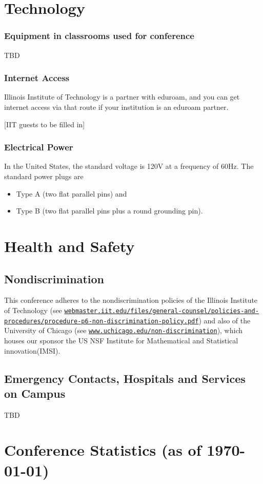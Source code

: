 \section{Technology}

\subsubsection{Equipment in classrooms used for conference}

TBD


\subsubsection{Internet Access}

Illinois Institute of Technology is a partner with eduroam, and you can get internet access via that route if your institution is an eduroam partner.

[IIT guests to be filled in]

\subsubsection{Electrical Power}

In the United States, the standard voltage is 120V at a frequency of 60Hz.  The standard power plugs are
\begin{itemize}
	\item Type A (two flat parallel pins) and
	\item Type B (two flat parallel pins plus a round grounding pin).
\end{itemize}

\section{Health and Safety}

\subsection{Nondiscrimination}
This conference adheres to the nondiscrimination policies of the Illinois Institute of Technology (see \href{https://webmaster.iit.edu/files/general-counsel/policies-and-procedures/procedure-p6-non-discrimination-policy.pdf}{\nolinkurl{webmaster.iit.edu/files/general-counsel/policies-and-procedures/procedure-p6-non-discrimination-policy.pdf}}) and also of the University of Chicago (see \href{https://www.uchicago.edu/non-discrimination}{\nolinkurl{www.uchicago.edu/non-discrimination}}), which houses our sponsor the US NSF Institute for Mathematical and Statistical innovation(IMSI).


\subsection{Emergency Contacts, Hospitals and Services on Campus}

TBD



\section{Conference Statistics (as of \today)}

 